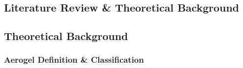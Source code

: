 \documentclass[a4paper,12pt]{article}
\begin{document}
\begin{table}[H]
\caption{List of proportions utlized in producing starch-carrageenan hybrid hydrogels}
\label{tab1}
\end{table}

\begin{table}[H]
\caption{List of proportions utlized in producing starch-alginate hybrid hydrogels}
\label{tab1}
\end{table}

\newpage

\begin{center}
  \section{Literature Review \& Theoretical Background}
\end{center}

\subsection{Theoretical Background}

\subsubsection{Aerogel Definition \& Classification}
\end{document}
